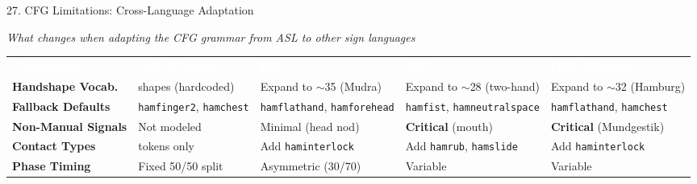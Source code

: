 \documentclass[aspectratio=169]{beamer}
\begin{document}
\begin{frame}[t]{27. CFG Limitations: Cross-Language Adaptation}
\vspace{-0.1cm}
\begin{center}
{\scriptsize\textit{What changes when adapting the CFG grammar from ASL to other sign languages}}
\end{center}

\vspace{0.05cm}

\begin{center}
\setlength{\tabcolsep}{3pt}
\renewcommand{\arraystretch}{1.25}
{\fontsize{5.8pt}{7.5pt}\selectfont
\begin{tabular}{
    >{\raggedright\arraybackslash\bfseries}m{2.3cm}
    >{\raggedright\arraybackslash}m{2.4cm}
    >{\raggedright\arraybackslash}m{2.4cm}
    >{\raggedright\arraybackslash}m{2.4cm}
    >{\raggedright\arraybackslash}m{2.4cm}
}
\rowcolor{maroon}
\centering\arraybackslash\textcolor{white}{\textbf{Component}} &
\centering\arraybackslash\textcolor{white}{\textbf{ASL (Current)}} &
\centering\arraybackslash\textcolor{white}{\textbf{ISL}} &
\centering\arraybackslash\textcolor{white}{\textbf{BSL}} &
\centering\arraybackslash\textcolor{white}{\textbf{DGS (German)}} \\

\rowcolor{lightblue}
Handshape Vocab. & 20 shapes (hardcoded) & Expand to $\sim$35 (Mudra) & Expand to $\sim$28 (two-hand) & Expand to $\sim$32 (Hamburg) \\

\rowcolor{lightgreen}
Fallback Defaults & \texttt{hamfinger2}, \texttt{hamchest} & \texttt{hamflathand}, \texttt{hamforehead} & \texttt{hamfist}, \texttt{hamneutralspace} & \texttt{hamflathand}, \texttt{hamchest} \\

\rowcolor{lightcyan}
Non-Manual Signals & Not modeled & Minimal (head nod) & \textbf{Critical} (mouth) & \textbf{Critical} (Mundgestik) \\

\rowcolor{lightorange}
Contact Types & 3 tokens only & Add \texttt{haminterlock} & Add \texttt{hamrub}, \texttt{hamslide} & Add \texttt{haminterlock} \\

\rowcolor{lightpurple}
Phase Timing & Fixed 50/50 split & Asymmetric (30/70) & Variable & Variable \\


\end{tabular}}
\end{center}
\end{frame}
\end{document}
